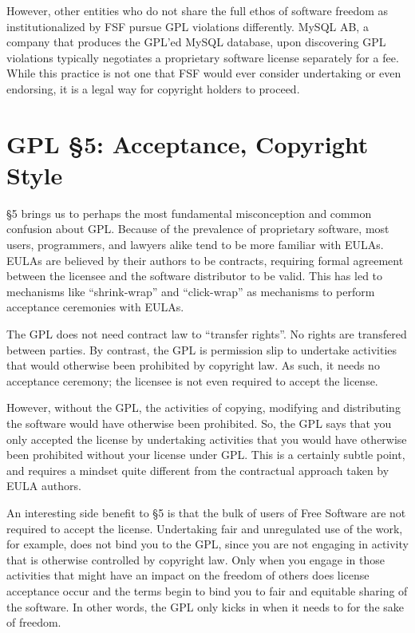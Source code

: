\documentclass[12pt]{report}
\begin{document}
However, other entities who do not share the full ethos of software
freedom as institutionalized by FSF pursue GPL violations differently.  MySQL
AB, a company that produces the GPL'ed MySQL database, upon discovering
GPL violations typically negotiates a proprietary software license
separately for a fee.  While this practice is not one that FSF would ever
consider undertaking or even endorsing, it is a legal way for copyright
holders to proceed.

\section{GPL \S 5: Acceptance, Copyright Style}
\label{GPLs5}

\S 5 brings us to perhaps the most fundamental misconception and common
confusion about GPL\@.  Because of the prevalence of proprietary software,
most users, programmers, and lawyers alike tend to be more familiar with
EULAs.  EULAs are believed by their authors to be contracts, requiring
formal agreement between the licensee and the software distributor to be
valid.  This has led to mechanisms like ``shrink-wrap'' and ``click-wrap''
as mechanisms to perform acceptance ceremonies with EULAs.

The GPL does not need contract law to ``transfer rights''.  No rights are
transfered between parties.  By contrast, the GPL is permission slip to
undertake activities that would otherwise been prohibited by copyright law.
As such, it needs no acceptance ceremony; the licensee is not even
required to accept the license.

However, without the GPL, the activities of copying, modifying and
distributing the software would have otherwise been prohibited.  So, the
GPL says that you only accepted the license by undertaking activities that
you would have otherwise been prohibited without your license under GPL\@.
This is a certainly subtle point, and requires a mindset quite different
from the contractual approach taken by EULA authors.

An interesting side benefit to \S 5 is that the bulk of users of Free
Software are not required to accept the license.  Undertaking fair and
unregulated use of the work, for example, does not bind you to the GPL,
since you are not engaging in activity that is otherwise controlled by
copyright law.  Only when you engage in those activities that might have an
impact on the freedom of others does license acceptance occur and the
terms begin to bind you to fair and equitable sharing of the software.  In
other words, the GPL only kicks in when it needs to for the sake of
freedom.
\end{document}

